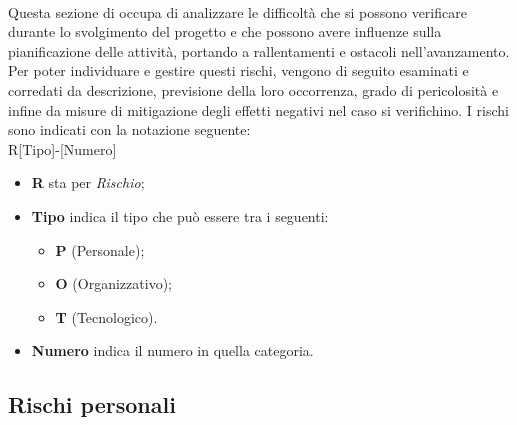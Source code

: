 \documentclass[10pt, a4paper]{article}
\begin{document}
{\paragraph{}Questa sezione di occupa di analizzare le difficoltà che si possono verificare durante lo svolgimento del progetto e che possono avere influenze sulla pianificazione delle attività, portando a rallentamenti e ostacoli nell'avanzamento.\\
Per poter individuare e gestire questi rischi, vengono di seguito esaminati e corredati da descrizione, previsione della loro occorrenza, grado di pericolosità e infine da misure di mitigazione degli effetti negativi nel caso si verifichino.
I rischi sono indicati con la notazione seguente: \\ R[Tipo]-[Numero] \ \  
\begin{itemize}
\item \textbf{R} sta per \textit{Rischio};
\item \textbf{Tipo} indica il tipo che può essere tra i seguenti:
    \begin{itemize}
	\item \textbf{P} (Personale);
	\item \textbf{O} (Organizzativo);
	\item \textbf{T} (Tecnologico).
    \end{itemize}
\item \textbf{Numero} indica il numero in quella categoria.
\end{itemize}



\subsection{Rischi personali}


}
\end{document}
